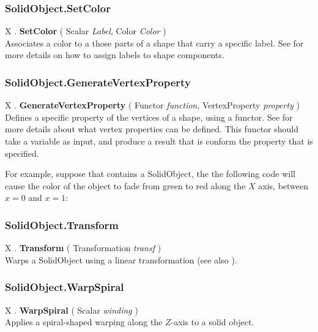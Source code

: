 \subsubsection{SolidObject.SetColor \label{F:SolidObject:SetColor}}
X . \textbf{SetColor} ( Scalar \textit{Label}, Color \textit{Color} ) \\
Associates a color to a those parts of a shape that carry a specific label. See  for more details on how to assign labels to shape components.

\subsubsection{SolidObject.GenerateVertexProperty \label{F:SolidObject:GenerateVertexProperty}}
X . \textbf{GenerateVertexProperty} ( Functor \textit{function}, VertexProperty \textit{property} ) \\
Defines a specific property of the vertices of a shape, using a functor. See  for more details about what vertex properties can be defined. This functor should take a  variable as input, and produce a result that is conform the property that is specified.

For example, suppose that  contains a SolidObject, the the following code will cause the color of the object to fade from green to red along the $X$ axis, between $x=0$ and $x=1$: \\

\subsubsection{SolidObject.Transform \label{F:SolidObject:Transform}}
X . \textbf{Transform} ( Transformation \textit{transf} ) \\
Warps a SolidObject using a linear transformation (see also ).

\subsubsection{SolidObject.WarpSpiral \label{F:SolidObject:WarpSpiral}}
X . \textbf{WarpSpiral} ( Scalar \textit{winding} ) \\
Applies a spiral-shaped warping along the $Z$-axis to a solid object.

